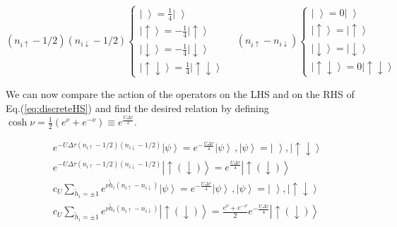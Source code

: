 \begin{equation}
(n_{i\uparrow} - 1/2 ) (n_{i\downarrow} - 1/2 )
\begin{cases}
\left| \, \, \right\rangle = \frac{1}{4} \left| \, \, \right\rangle \\
\left| \uparrow \right\rangle = -\frac{1}{4} \left| \uparrow \right\rangle \\
\left| \downarrow \right\rangle = -\frac{1}{4} \left| \downarrow \right\rangle \\
\left| \uparrow \downarrow \right\rangle = \frac{1}{4} \left| \uparrow \downarrow \right\rangle
\end{cases} \quad
(n_{i\uparrow} - n_{i\downarrow} )
\begin{cases}
\left| \, \, \right\rangle = 0\left| \, \, \right\rangle \\
\left| \uparrow \right\rangle = \left| \uparrow \right\rangle \\
\left| \downarrow \right\rangle = \left| \downarrow \right\rangle \\
\left| \uparrow \downarrow \right\rangle = 0 \left| \uparrow \downarrow \right\rangle
\end{cases}
\end{equation}

We can now compare the action of the operators on the LHS and on the RHS of Eq.(\ref{eq:discreteHS}) and find the desired relation by defining
$
\cosh \nu =  \frac{1}{2} ( e^\nu + e^{-\nu} ) \equiv e^{\frac{U\Delta \tau}{2}}
$.

\begin{equation}
\begin{split}
&e^{-U \Delta\tau (n_{i\uparrow} - 1/2 ) (n_{i\downarrow} - 1/2 )} \left| \psi \right\rangle = e^{-\frac{U\Delta \tau}{4}} \left| \psi \right\rangle \, , \left| \psi \right\rangle = \left| \, \, \right\rangle, \left| \uparrow \downarrow \right\rangle \\
&e^{-U \Delta\tau (n_{i\uparrow} - 1/2 ) (n_{i\downarrow} - 1/2 )} \left| \uparrow (\downarrow) \right\rangle = e^{\frac{U\Delta \tau}{4}} \left| \uparrow (\downarrow) \right\rangle \\
&c_U \sum_{\widetilde{h}_i = \pm 1} e^{\nu \widetilde{h}_i (n_{i\uparrow} - n_{i\downarrow} )} \left| \psi \right\rangle = e^{-\frac{U\Delta \tau}{4}} \left| \psi \right\rangle \, , \left| \psi \right\rangle = \left| \, \, \right\rangle, \left| \uparrow \downarrow \right\rangle \\
&c_U \sum_{\widetilde{h}_i = \pm 1} e^{\nu \widetilde{h}_i (n_{i\uparrow} - n_{i\downarrow} )} \left| \uparrow (\downarrow) \right\rangle= \frac{e^\nu + e^{-\nu}}{2} e^{-\frac{U\Delta \tau}{4}}  \left| \uparrow (\downarrow) \right\rangle
\end{split}
\end{equation}

